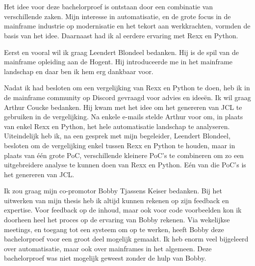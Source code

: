 
\chapter*{}%
\label{ch:voorwoord}


Het idee voor deze bachelorproef is ontstaan door een combinatie van verschillende zaken. Mijn interesse in automatisatie, en de grote focus in de mainframe industrie op modernisatie en het tekort aan werkkrachten, vormden de basis van het idee. Daarnaast had ik al eerdere ervaring met Rexx en Python.

Eerst en vooral wil ik graag Leendert Blondeel bedanken. Hij is de spil van de mainframe opleiding aan de Hogent. Hij introduceerde me in het mainframe landschap en daar ben ik hem erg dankbaar voor. 

Nadat ik had besloten om een vergelijking van Rexx en Python te doen, heb ik in de mainframe community op Discord gevraagd voor advies en ideeën. Ik wil graag Arthur Coucke bedanken. Hij kwam met het idee om het genereren van JCL te gebruiken in de vergelijking. Na enkele e-mails stelde Arthur voor om, in plaats van enkel Rexx en Python, het hele automatisatie landschap te analyseren. Uiteindelijk heb ik, na een gesprek met mijn begeleider, Leendert Blondeel, besloten om de vergelijking enkel tussen Rexx en Python te houden, maar in plaats van één grote PoC, verschillende kleinere PoC's te combineren om zo een uitgebreidere analyse te kunnen doen van Rexx en Python. Eén van die PoC's is het genereren van JCL.

Ik zou graag mijn co-promotor Bobby Tjassens Keiser bedanken. Bij het uitwerken van mijn thesis heb ik altijd kunnen rekenen op zijn feedback en expertise. Voor feedback op de inhoud, maar ook voor code voorbeelden kon ik doorheen heel het proces op de ervaring van Bobby rekenen. Via wekelijkse meetings, en toegang tot een systeem om op te werken, heeft Bobby deze bachelorproef voor een groot deel mogelijk gemaakt. Ik heb enorm veel bijgeleerd over automatisatie, maar ook over mainframes in het algemeen. Deze bachelorproef was niet mogelijk geweest zonder de hulp van Bobby.

